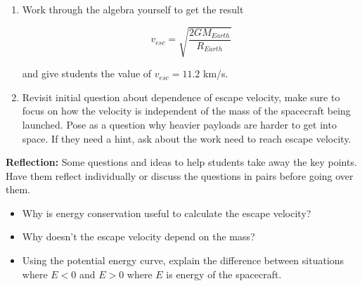 \documentclass{article}
\begin{document}
\begin{enumerate}
\item Work through the algebra yourself to get the result

\begin{equation}
v_{esc} = \sqrt{\frac{2 G M_{Earth}}{R_{Earth}}}
\end{equation}

and give students the value of $v_{esc} = 11.2$ km/s.

\item Revisit initial question about dependence of escape velocity, make sure to focus on how the velocity is independent of the mass of the spacecraft being launched. Pose as a question why heavier payloads are harder to get into space. If they need a hint, ask about the work need to reach escape velocity. 
\end{enumerate}

\textbf{Reflection:} Some questions and ideas to help students take away the key points. Have them reflect individually or discuss the questions in pairs before going over them. 

\begin{itemize}
\item Why is energy conservation useful to calculate the escape velocity?
\item Why doesn't the escape velocity depend on the mass?
\item Using the potential energy curve, explain the difference between situations where $E < 0$ and $E > 0$ where $E$ is energy of the spacecraft.
\end{itemize}

\end{document}
